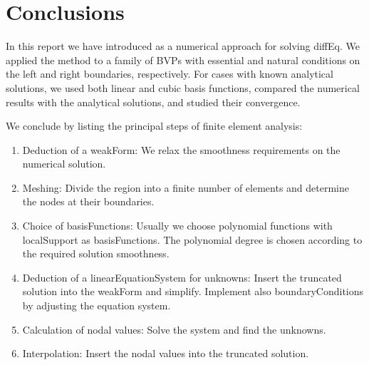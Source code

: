 \chapter{Conclusions} \label{cha:Conclusions}
In this report we have introduced  as a numerical approach for solving \gls{diffEq}.
We applied the method to a family of \glspl{BVP} with essential and natural conditions on the left and right boundaries,
respectively. For cases with known analytical solutions, we used both linear and cubic basis functions, compared the numerical
results with the analytical solutions, and studied their convergence.

We conclude by listing the principal steps of finite element analysis:
\begin{enumerate}
	\item Deduction of a \gls{weakForm}: We relax the smoothness requirements on the numerical solution.

	\item Meshing: Divide the \gls{region} into a finite number of elements and determine the nodes at their boundaries.

	\item Choice of \glspl{basisFunction}: Usually we choose polynomial functions with \gls{localSupport} as \glspl{basisFunction}.
		  The polynomial degree is chosen according to the required solution smoothness.

	\item Deduction of a \gls{linearEquationSystem} for unknowns: Insert the truncated solution into the \gls{weakForm} and
		  simplify. Implement also \glspl{boundaryCondition} by adjusting the equation system.

	\item Calculation of nodal values: Solve the system and find the unknowns.

	\item Interpolation: Insert the nodal values into the truncated solution.
\end{enumerate}
%